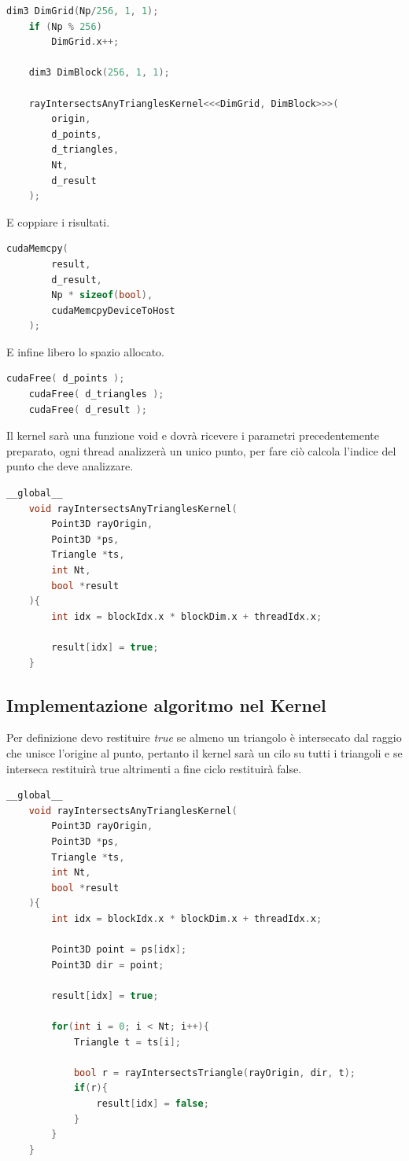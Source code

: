 \documentclass[a4paper]{article}
\begin{document}
\begin{lstlisting}[language=c++]
    dim3 DimGrid(Np/256, 1, 1);
    if (Np % 256)
        DimGrid.x++;

    dim3 DimBlock(256, 1, 1);

    rayIntersectsAnyTrianglesKernel<<<DimGrid, DimBlock>>>(
        origin, 
        d_points, 
        d_triangles, 
        Nt, 
        d_result
    );
\end{lstlisting}

E coppiare i risultati.

\begin{lstlisting}[language=c++]
    cudaMemcpy(
        result, 
        d_result, 
        Np * sizeof(bool),
        cudaMemcpyDeviceToHost
    );
\end{lstlisting}

E infine libero lo spazio allocato.

\begin{lstlisting}[language=c++]
    cudaFree( d_points );
    cudaFree( d_triangles );
    cudaFree( d_result );
\end{lstlisting}

Il kernel sarà una funzione void e dovrà ricevere i parametri precedentemente preparato, ogni thread analizzerà un unico punto, per fare ciò calcola l'indice del punto che deve analizzare.

\begin{lstlisting}[language=c++]
    __global__
    void rayIntersectsAnyTrianglesKernel(
        Point3D rayOrigin, 
        Point3D *ps,
        Triangle *ts,
        int Nt,
        bool *result
    ){
        int idx = blockIdx.x * blockDim.x + threadIdx.x;

        result[idx] = true;
    }
\end{lstlisting}

\newpage

\subsection{Implementazione algoritmo nel Kernel}

Per definizione devo restituire \emph{true} se almeno un triangolo è intersecato dal raggio che unisce l'origine al punto, pertanto il kernel sarà un cilo su tutti i triangoli e se interseca restituirà true altrimenti a fine ciclo restituirà false.

\begin{lstlisting}[language=c++]
    __global__
    void rayIntersectsAnyTrianglesKernel(
        Point3D rayOrigin, 
        Point3D *ps,
        Triangle *ts,
        int Nt,
        bool *result
    ){
        int idx = blockIdx.x * blockDim.x + threadIdx.x;

        Point3D point = ps[idx];
        Point3D dir = point;

        result[idx] = true;
        
        for(int i = 0; i < Nt; i++){
            Triangle t = ts[i];
            
            bool r = rayIntersectsTriangle(rayOrigin, dir, t);
            if(r){
                result[idx] = false;
            }
        }	
    }
\end{lstlisting}
\end{document}

